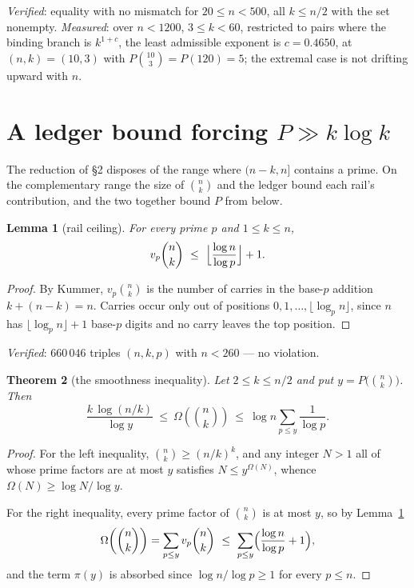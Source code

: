 \documentclass[11pt]{article}
\newtheorem{theorem}{Theorem}
\newtheorem{lemma}[theorem]{Lemma}
\begin{document}
\emph{Verified}: equality with no mismatch for $20\le n<500$, all $k\le n/2$ with the set
nonempty.  \emph{Measured}: over $n<1200$, $3\le k<60$, restricted to pairs where the binding
branch is $k^{1+c}$, the least admissible exponent is $c=0.4650$, at $(n,k)=(10,3)$ with
$P\binom{10}{3}=P(120)=5$; the extremal case is not drifting upward with $n$.

\section{A ledger bound forcing $P\gg k\log k$}

The reduction of \S2 disposes of the range where $(n-k,n]$ contains a prime.  On the
complementary range the size of $\binom nk$ and the ledger bound each rail's contribution,
and the two together bound $P$ from below.

\begin{lemma}[rail ceiling]\label{lem:railceil}
For every prime $p$ and $1\le k\le n$,
\[
  v_p\binom nk\ \le\ \Bigl\lfloor \frac{\log n}{\log p}\Bigr\rfloor+1 .
\]
\end{lemma}

\begin{proof}
By Kummer, $v_p\binom nk$ is the number of carries in the base-$p$ addition $k+(n-k)=n$.
Carries occur only out of positions $0,1,\dots,\lfloor\log_pn\rfloor$, since $n$ has
$\lfloor\log_pn\rfloor+1$ base-$p$ digits and no carry leaves the top position.
\end{proof}

\emph{Verified}: $660\,046$ triples $(n,k,p)$ with $n<260$ --- no violation.

\begin{theorem}[the smoothness inequality]\label{thm:smoothineq}
Let $2\le k\le n/2$ and put $y=P\bigl(\binom nk\bigr)$.  Then
\[
  \frac{k\,\log(n/k)}{\log y}\ \le\ \Omega\!\left(\binom nk\right)\ \le\
  \log n\sum_{p\le y}\frac{1}{\log p} .
\]
\end{theorem}

\begin{proof}
For the left inequality, $\binom nk\ge(n/k)^{k}$, and any integer $N>1$ all of whose prime
factors are at most $y$ satisfies $N\le y^{\Omega(N)}$, whence
$\Omega(N)\ge\log N/\log y$.

For the right inequality, every prime factor of $\binom nk$ is at most $y$, so by
Lemma~\ref{lem:railceil}
\[
  \Omega\!\left(\binom nk\right)=\sum_{p\le y}v_p\binom nk
  \ \le\ \sum_{p\le y}\Bigl(\frac{\log n}{\log p}+1\Bigr),
\]
and the term $\pi(y)$ is absorbed since $\log n/\log p\ge1$ for every $p\le n$.
\end{proof}
\end{document}
